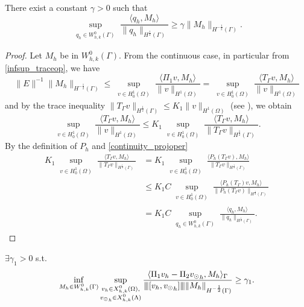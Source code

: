 \begin{lemma}\label{lemma:trspace_infsup} 
There exist a constant $\gamma >0$ such that
\begin{equation*}
\sup_{\substack{q_h \in W_{h,k}^0(\Gamma)}} \frac{\langle q_h , M_h \rangle}{ \|q_h\|_{H^{\frac 12}(\Gamma)}} \geq \gamma \|M_h\|_{H^{-\frac 12}(\Gamma)}.
\end{equation*} 
\end{lemma}
\begin{proof}
Let $M_h$ be in $W_{h,k}^0(\Gamma)$. From the continuous case, in particular from \eqref{infsup_traceop}, we have
\begin{equation*}
\|E\|^{-1} \|M_h\|_{H^{-\frac 12}(\Gamma)} \leq \sup_{\substack{v \in H^1_0(\Omega)}} \frac{\langle \Pi_1 v , M_h \rangle}{\|v\|_{H^1(\Omega)}} =\sup_{\substack{v \in H^1_0(\Omega)}} \frac{\langle T_{\Gamma} v , M_h \rangle}{\|v\|_{H^1(\Omega)}}
\end{equation*}
and by the trace inequality $\|T_{\Gamma}v\|_{H^\frac 12 (\Gamma)} \leq K_1 \|v\|_{H^1(\Omega)}$ (see \cite[7.56]{adams1975pure}), we obtain 
\begin{equation*}
\sup_{\substack{v \in H^1_0(\Omega)}} \frac{\langle T_{\Gamma} v , M_h \rangle}{\|v\|_{H^1(\Omega)}}
\leq K_1 \sup_{\substack{v \in H^1_0(\Omega)}} \frac{\langle T_{\Gamma} v , M_h \rangle}{ \|T_{\Gamma}v\|_{H^{\frac 12}(\Gamma)}}.
\end{equation*}
By the definition of $P_h$ and \eqref{continuity_projoper} 
\begin{equation*}
\begin{split}
K_1 \sup_{\substack{v \in H^1_0(\Omega)}} \frac{\langle T_{\Gamma} v , M_h \rangle}{ \|T_{\Gamma}v\|_{H^{\frac 12}(\Gamma)}}&= K_1 \sup_{\substack{v \in H^1_0(\Omega)}} \frac{\langle P_h(T_{\Gamma} v) , M_h \rangle}{ \|T_{\Gamma}v\|_{H^{\frac 12}(\Gamma)}}\\
&\leq  K_1 C \sup_{\substack{v \in H^1_0(\Omega)}} \frac{\langle P_h(T_{\Gamma}) v , M_h \rangle}{ \|P_h(T_{\Gamma}v)\|_{H^{\frac 12}(\Gamma)}}\\
&= K_1 C \sup_{\substack{q_h \in W_{h,k}^0(\Gamma)}} \frac{\langle q_h , M_h \rangle}{  \|q_h\|_{H^{\frac 12}(\Gamma)}}.
\end{split}
\end{equation*}
\end{proof}

\begin{theorem} 
$\exists \gamma _1 >0$ s.t.
\begin{equation}\label{inf_sup_discrete_prob1}
\inf_{M_h \in W^0_{h,k}(\Gamma)} 
\sup_{\substack{v_h \in X^0_{h,k}(\Omega),\\ {\vd}_h \in X^0_{h,k}(\Lambda)}} \frac{ \langle \Pi_1 v_h - \Pi_2 {\vd}_h, M_h \rangle _{\Gamma}} {\vertiii{[v_h, {\vd} _h]} \|M_h\|_{H^{-\frac 12 }(\Gamma)}} 
\geq \gamma _1. 
\end{equation}
\end{theorem}

